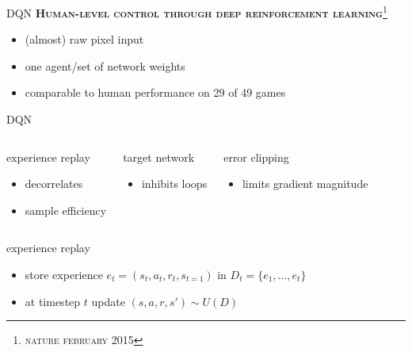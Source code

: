 \begin{frame}{DQN}
   \textbf{\textsc{Human-level control through deep reinforcement learning}}\footnote{\textsc{nature february  2015}}
\begin{itemize}
    \item (almost) raw pixel input
    \item one agent/set of network weights
    \item comparable to human performance on 29 of 49 games
\end{itemize}
\end{frame}

\begin{frame}{DQN}
      \begin{columns}[T,onlytextwidth]

          \begin{block}{experience replay}
            \begin{itemize}
                \item decorrelates
                \item sample efficiency
            \end{itemize}
      \end{block}


          \begin{block}{target network}
            \begin{itemize}
                \item inhibits loops
            \end{itemize}
      \end{block}
          \begin{block}{error clipping}
            \begin{itemize}
                \item limits gradient magnitude
            \end{itemize}
      \end{block}

  \end{columns}
\end{frame}

\begin{frame}{experience replay}

    
        \begin{itemize}
        \item store experience $e_t=(s_t,a_t,r_t,s_{t=1})$ in $D_t=\{e_1,\dots,e_t\}$
        \item at timestep $t$ update $(s,a,r,s')\sim U(D)$
        \end{itemize}
      

\end{frame}

